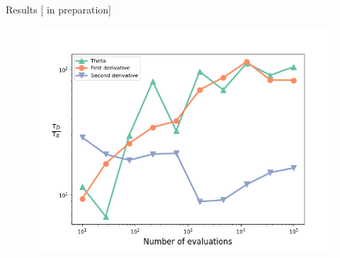 \documentclass[10pt]{beamer}
\begin{document}
\begin{frame}{Results \hfill \small [\cite{new} in preparation]}
    \begin{figure}[t]
            \includegraphics[width=0.8\columnwidth]{figures/theta.png}
            \label{fig:theta}
    \end{figure}
\end{frame}
\end{document}
